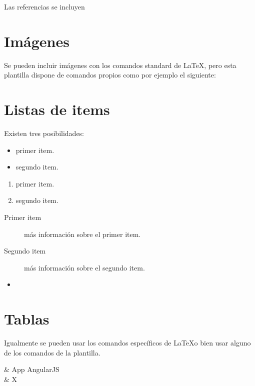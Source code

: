 Las referencias se incluyen 


\section{Imágenes}

Se pueden incluir imágenes con los comandos standard de \LaTeX, pero esta plantilla dispone de comandos propios como por ejemplo el siguiente:


\section{Listas de items}

Existen tres posibilidades:

\begin{itemize}
	\item primer item.
	\item segundo item.
\end{itemize}

\begin{enumerate}
	\item primer item.
	\item segundo item.
\end{enumerate}

\begin{description}
	\item[Primer item] más información sobre el primer item.
	\item[Segundo item] más información sobre el segundo item.
\end{description}
	
\begin{itemize}
\item 
\end{itemize}

\section{Tablas}

Igualmente se pueden usar los comandos específicos de \LaTeX o bien usar alguno de los comandos de la plantilla.

{  & App AngularJS  \\}{ 
 & X \\
} 

